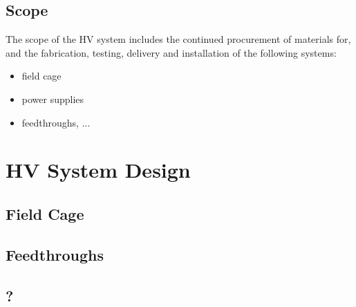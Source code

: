 

\subsection{Scope}
\label{sec:fddp-hv-scope}

The scope of the HV system includes the continued procurement of materials for, and the fabrication, testing, delivery and installation of the following systems: 


\begin{itemize}
\item field cage
\item power supplies 
\item feedthroughs, ...
\end{itemize}



\section{HV System Design}
\label{sec:fddp-hv-design}






\subsection{Field Cage}
\label{sec:fddp-hv-fc}

\subsection{Feedthroughs}
\label{sec:fddp-hv-feed}

\subsection{?}
\label{sec:fddp-hv-?}


